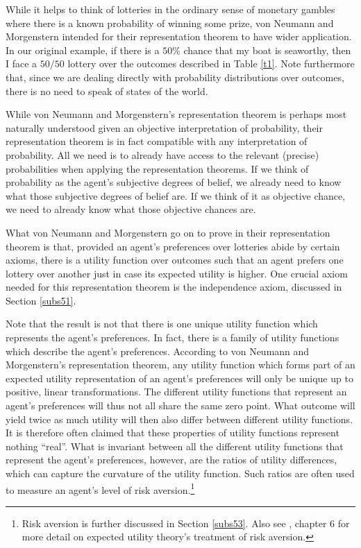 While it helps to think of lotteries in the ordinary sense of monetary gambles where there is a known probability of winning some prize, von Neumann and Morgenstern intended for their representation theorem to have wider application. In our original example, if there is a $50\%$ chance that my boat is seaworthy, then I face a $50/50$ lottery over the outcomes described in Table \ref{t1}. Note furthermore that, since we are dealing directly with probability distributions over outcomes, there is no need to speak of states of the world.

While von Neumann and Morgenstern's representation theorem is perhaps most naturally understood given an objective interpretation of probability, their representation theorem is in fact compatible with any interpretation of probability. All we need is to already have access to the relevant (precise) probabilities when applying the representation theorems. If we think of probability as the agent's subjective degrees of belief, we already need to know what those subjective degrees of belief are. If we think of it as objective chance, we need to already know what those objective chances are.

What von Neumann and Morgenstern go on to prove in their representation theorem is that, provided an agent's preferences over lotteries abide by certain axioms, there is a utility function over outcomes such that an agent prefers one lottery over another just in case its expected utility is higher. One crucial axiom needed for this representation theorem is the independence axiom, discussed in Section \ref{subs51}.

Note that the result is not that there is one unique utility function which represents the agent's preferences. In fact, there is a family of utility functions which describe the agent's preferences. According to von Neumann and Morgenstern's representation theorem, any utility function which forms part of an expected utility representation of an agent's preferences will only be unique up to positive, linear transformations. The different utility functions that represent an agent's preferences will thus not all share the same zero point. What outcome will yield twice as much utility will then also differ between different utility functions. It is therefore often claimed that these properties of utility functions represent nothing ``real''. What is invariant between all the different utility functions that represent the agent's preferences, however, are the ratios of utility differences, which can capture the curvature of the utility function. Such ratios are often used to measure an agent's level of risk aversion.\footnote{Risk aversion is further discussed in Section \ref{subs53}. Also see \citet{Mas-Colell1995}, chapter 6 for more detail on expected utility theory's treatment of risk aversion.}

